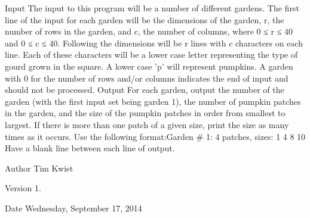 Input The input to this program will be a number of different gardens. The first line of the input for each garden will be the dimensions of the garden, r, the number of rows in the garden, and c, the number of columns, where 0 ≤ r ≤ 40 and 0 ≤ c ≤ 40. Following the dimensions will be r lines with c characters on each line. Each of these characters will be a lower case letter representing the type of gourd grown in the square. A lower case 'p' will represent pumpkins. A garden with 0 for the number of rows and/or columns indicates the end of input and should not be processed. Output For each garden, output the number of the garden (with the first input set being garden 1), the number of pumpkin patches in the garden, and the size of the pumpkin patches in order from smallest to largest. If there is more than one patch of a given size, print the size as many times as it occurs. Use the following format\+:Garden \# 1\+: 4 patches, sizes\+: 1 4 8 10 Have a blank line between each line of output. \begin{DoxyAuthor}{Author}
Tim Kwist 
\end{DoxyAuthor}
\begin{DoxyVersion}{Version}
1. 
\end{DoxyVersion}
\begin{DoxyDate}{Date}
Wednesday, September 17, 2014 
\end{DoxyDate}
